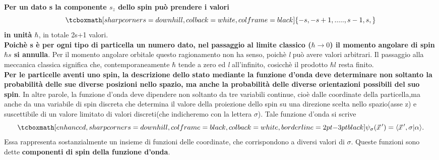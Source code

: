 \documentclass[a4paper,12pt,oneside]{book}
\begin{document}
\textbf{Per un dato s la componente $s_{z}$ dello spin può prendere i valori}
	\begin{equation}
		\tcboxmath[sharp corners=downhill, colback=white, colframe=black]{
			-s, -s+1,.....,s-1,s ,
			}
	\end{equation}
\textbf{in unità $\hbar$}, in totale 2s+1 valori.\\

\textbf{Poichè s è per ogni tipo di particella un numero dato, nel passaggio al limite classico ($\hbar\rightarrow0$) il momento angolare di spin $\hbar s$ si annulla}. Per il momento angolare orbitale questo ragionamento non ha senso, poichè \textit{l} può avere valori arbitrari. Il passaggio alla meccanica classica significa che, contemporaneamente $\hbar$ tende a zero ed \textit{l} all'infinito, cosicchè il prodotto $\hbar l$ resta finito.\\

\textbf{Per le particelle aventi uno spin, la descrizione dello stato mediante la funzione d'onda deve determinare non soltanto la probabilità delle sue diverse posizioni nello spazio, ma anche la probabilità delle diverse orientazioni possibili del suo spin}.
In altre parole, la funzione d'onda deve dipendere non soltanto da tre variabili continue, cioè dalle coordinate della particella,ma anche da una variabile di spin discreta che determina il valore della proiezione dello spin su una direzione scelta nello spazio(asse z) e suscettibile di un valore limitato di valori discreti(che indicheremo con la lettera $\sigma$). Tale funzione d'onda si scrive
	\begin{equation}
		\tcboxmath[enhanced, sharp corners=downhill, colframe=black, colback=white, borderline={2pt}{-3pt}{black}]{
			\psi_{\sigma}(\vec{x}^{\, \prime})=\langle\vec{x}^{\, \prime}, \sigma|\alpha\rangle .
			}
	\end{equation} 
Essa rappresenta sostanzialmente un insieme di funzioni delle coordinate, che corrispondono a diversi valori di $\sigma$. Queste funzioni sono dette \textbf{componenti di spin della funzione d'onda}.\\
\end{document}
